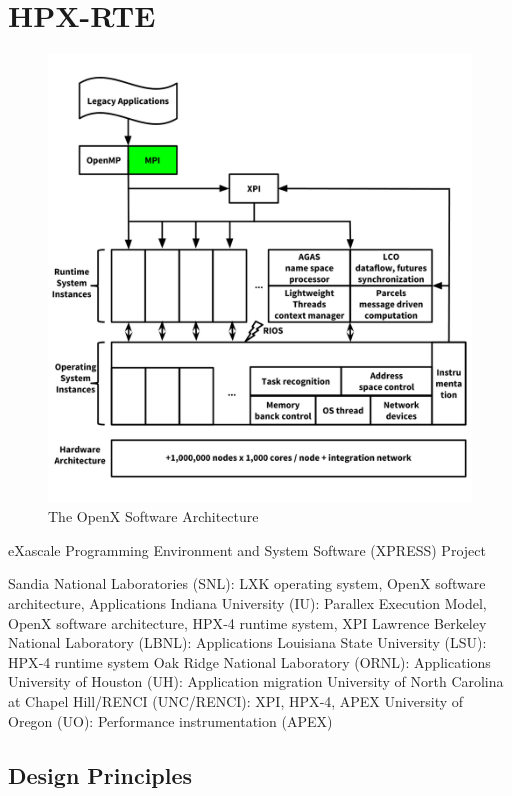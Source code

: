 \chapter{HPX-RTE}
\label{sec:HPX-RTE}


\begin{figure}[h!]
\centering
\includegraphics[scale=0.8]{images/openx.png}
\caption[The OpenX Software Architecture]{The OpenX Software Architecture}
\label{fig:openx}
\end{figure}

eXascale Programming Environment and System Software (XPRESS) Project

Sandia National Laboratories (SNL): LXK operating system, OpenX software architecture, Applications
Indiana University (IU): Parallex Execution Model, OpenX software architecture, HPX‐4 runtime system, XPI
Lawrence Berkeley National Laboratory (LBNL): Applications
Louisiana State University (LSU): HPX‐4 runtime system
Oak Ridge National Laboratory (ORNL): Applications
University of Houston (UH): Application migration
University of North Carolina at Chapel Hill/RENCI (UNC/RENCI): XPI, HPX‐4, APEX
University of Oregon (UO): Performance instrumentation (APEX)
\section{Design Principles}
\label{sec:design}

